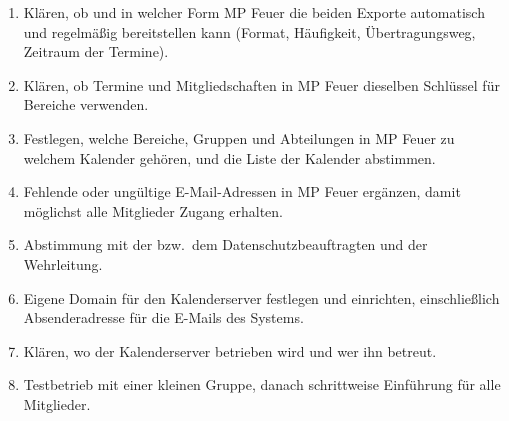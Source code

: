 \documentclass[a4paper,fontsize=10pt]{scrartcl}
\begin{document}
\begin{enumerate}
  \item Klären, ob und in welcher Form MP Feuer die beiden Exporte
        automatisch und regelmäßig bereitstellen kann (Format, Häufigkeit,
        Übertragungsweg, Zeitraum der Termine).
  \item Klären, ob Termine und Mitgliedschaften in MP Feuer dieselben
        Schlüssel für Bereiche verwenden.
  \item Festlegen, welche Bereiche, Gruppen und Abteilungen in MP Feuer zu
        welchem Kalender gehören, und die Liste der Kalender abstimmen.
  \item Fehlende oder ungültige E-Mail-Adressen in MP Feuer ergänzen, damit
        möglichst alle Mitglieder Zugang erhalten.
  \item Abstimmung mit der bzw.\ dem Datenschutzbeauftragten und der
        Wehrleitung.
  \item Eigene Domain für den Kalenderserver festlegen und einrichten,
        einschließlich Absenderadresse für die E-Mails des Systems.
  \item Klären, wo der Kalenderserver betrieben wird und wer ihn betreut.
  \item Testbetrieb mit einer kleinen Gruppe, danach schrittweise Einführung
        für alle Mitglieder.
\end{enumerate}
\end{document}
